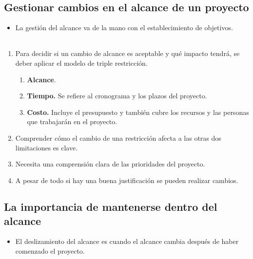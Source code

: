 \documentclass[10pt]{book}
\begin{document}
    \subsection{Gestionar cambios en el alcance de un proyecto}
    \begin{itemize}
	\item La gestión del alcance va de la mano con el establecimiento de objetivos.\\\\
    \end{itemize}
    \begin{enumerate}[\bfseries 1.]
	\item Para decidir si un cambio de alcance es aceptable y qué impacto tendrá, se deber aplicar el modelo de triple restricción.
	\begin{enumerate}
	    \item \textbf{Alcance}.
	    \item \textbf{Tiempo.} Se refiere al cronograma y los plazos del proyecto.
	    \item \textbf{Costo.} Incluye el presupuesto y también cubre los recursos y las personas que trabajarán en el proyecto.
	\end{enumerate}
	\item Comprender cómo el cambio de una restricción afecta a las otras dos limitaciones es clave.
	\item Necesita una comprensión clara de las prioridades del proyecto.
	\item A pesar de todo si hay una buena justificación se pueden realizar cambios.
    \end{enumerate}
    
    \subsection{La importancia de mantenerse dentro del alcance}
    \begin{itemize}
	\item El deslizamiento del alcance es cuando el alcance cambia después de haber comenzado el proyecto.
    \end{itemize}
\end{document}

